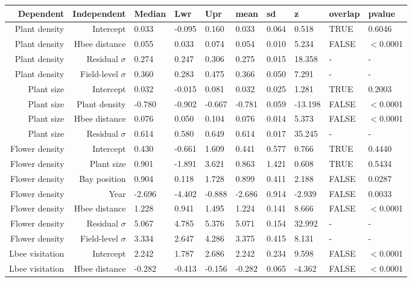 \begin{landscape}
\begin{longtable}{|r|r|l|l|l|l|l|l|l|l|}
    \hline
    Dependent & Independent & Median & Lwr & Upr & mean & sd & z & overlap & pvalue \\ 
    \hline
    Plant density & Intercept & 0.033 & -0.095 & 0.160 & 0.033 & 0.064 & 0.518 & TRUE & 0.6046 \\ 
    Plant density & Hbee distance & 0.055 & 0.033 & 0.074 & 0.054 & 0.010 & 5.234 & FALSE & $<$0.0001 \\ 
    Plant density & Residual $\sigma$ & 0.274 & 0.247 & 0.306 & 0.275 & 0.015 & 18.358 & - & - \\ 
    Plant density & Field-level $\sigma$ & 0.360 & 0.283 & 0.475 & 0.366 & 0.050 & 7.291 &  - & - \\ 
    \hline
    Plant size & Intercept & 0.032 & -0.015 & 0.081 & 0.032 & 0.025 & 1.281 & TRUE & 0.2003 \\ 
    Plant size & Plant density & -0.780 & -0.902 & -0.667 & -0.781 & 0.059 & -13.198 & FALSE & $<$0.0001 \\ 
    Plant size & Hbee distance & 0.076 & 0.050 & 0.104 & 0.076 & 0.014 & 5.373 & FALSE & $<$0.0001 \\ 
    Plant size & Residual $\sigma$ & 0.614 & 0.580 & 0.649 & 0.614 & 0.017 & 35.245 &  - & -  \\ 
    \hline
    Flower density & Intercept & 0.430 & -0.661 & 1.609 & 0.441 & 0.577 & 0.766 & TRUE & 0.4440 \\ 
    Flower density & Plant size & 0.901 & -1.891 & 3.621 & 0.863 & 1.421 & 0.608 & TRUE & 0.5434 \\ 
    Flower density & Bay position & 0.904 & 0.118 & 1.728 & 0.899 & 0.411 & 2.188 & FALSE & 0.0287 \\ 
    Flower density & Year & -2.696 & -4.402 & -0.888 & -2.686 & 0.914 & -2.939 & FALSE & 0.0033 \\ 
    Flower density & Hbee distance & 1.228 & 0.941 & 1.495 & 1.224 & 0.141 & 8.666 & FALSE & $<$0.0001 \\ 
    Flower density & Residual $\sigma$ & 5.067 & 4.785 & 5.376 & 5.071 & 0.154 & 32.992 &  - & -  \\ 
    Flower density & Field-level $\sigma$ & 3.334 & 2.647 & 4.286 & 3.375 & 0.415 & 8.131 &  - & -  \\ 
    \hline
    Lbee visitation & Intercept & 2.242 & 1.787 & 2.686 & 2.242 & 0.234 & 9.598 & FALSE & $<$0.0001 \\ 
    Lbee visitation & Hbee distance & -0.282 & -0.413 & -0.156 & -0.282 & 0.065 & -4.362 & FALSE & $<$0.0001 \\ 

\end{longtable}
\end{landscape}
